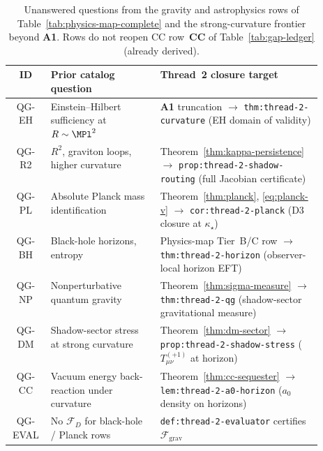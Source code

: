 \begin{table}[ht]
\centering
\small
\renewcommand{\arraystretch}{1.10}
\begin{tabular}{@{}clp{0.52\linewidth}@{}}
\toprule
\textbf{ID} & \textbf{Prior catalog question} & \textbf{Thread~2 closure target} \\
\midrule
QG-EH &
  Einstein--Hilbert sufficiency at $R\sim\MPl^2$ &
  \textbf{A1} truncation $\to$
  \texttt{thm:thread-2-curvature} (EH domain of validity) \\
QG-R2 &
  $R^2$, graviton loops, higher curvature &
  Theorem~\ref{thm:kappa-persistence} $\to$
  \texttt{prop:thread-2-shadow-routing} (full Jacobian certificate) \\
QG-PL &
  Absolute Planck mass identification &
  Theorem~\ref{thm:planck}, \eqref{eq:planck-v} $\to$
  \texttt{cor:thread-2-planck} (D3 closure at $\kappa_\star$) \\
QG-BH &
  Black-hole horizons, entropy &
  Physics-map Tier~B/C row $\to$
  \texttt{thm:thread-2-horizon} (observer-local horizon EFT) \\
QG-NP &
  Nonperturbative quantum gravity &
  Theorem~\ref{thm:sigma-measure} $\to$
  \texttt{thm:thread-2-qg} (shadow-sector gravitational measure) \\
QG-DM &
  Shadow-sector stress at strong curvature &
  Theorem~\ref{thm:dm-sector} $\to$
  \texttt{prop:thread-2-shadow-stress} ($T_{\mu\nu}^{(+1)}$ at horizon) \\
QG-CC &
  Vacuum energy back-reaction under curvature &
  Theorem~\ref{thm:cc-sequester} $\to$
  \texttt{lem:thread-2-a0-horizon} ($a_0$ density on horizons) \\
QG-EVAL &
  No $\mathcal{F}_D$ for black-hole / Planck rows &
  \texttt{def:thread-2-evaluator} certifies
  $\mathcal{F}_{\mathrm{grav}}$ \\
\bottomrule
\end{tabular}
\caption{Unanswered questions from the gravity and astrophysics rows of
Table~\ref{tab:physics-map-complete} and the strong-curvature frontier beyond
\textbf{A1}. Rows do not reopen CC row~\textbf{CC} of
Table~\ref{tab:gap-ledger} (already derived).}
\label{tab:thread-2-questions}
\end{table}

